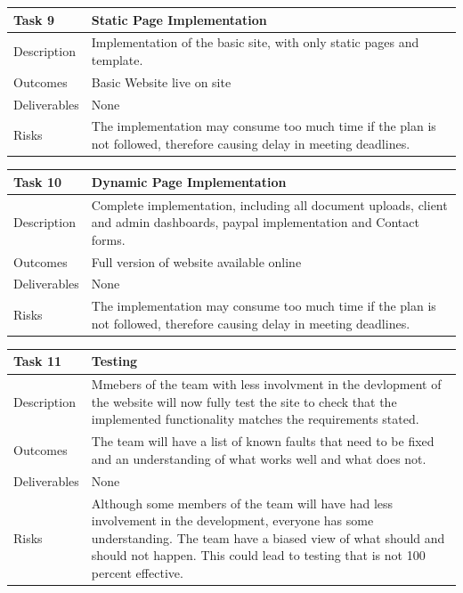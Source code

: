 \documentclass{l3proj}
\begin{document}
\begin{center}
    \begin{tabular}{ | l | p{12cm} |}
    \hline	
    Task 9 & Static Page Implementation \\ \hline
    Description & Implementation of the basic site, with only static pages and template. \\ \hline   
    Outcomes & Basic Website live on site \\ \hline
    Deliverables & None \\ \hline
    Risks & The implementation may consume too much time if the plan is not followed, therefore causing delay in meeting deadlines. \\ 
    \hline
    \end{tabular}
\end{center}

\begin{center}
    \begin{tabular}{ | l | p{12cm} |}
    \hline	
    Task 10 & Dynamic Page Implementation \\ \hline
    Description & Complete implementation, including all document uploads, client and admin dashboards, paypal implementation and Contact forms. \\ \hline   
    Outcomes & Full version of website available online \\ \hline
    Deliverables & None \\ \hline
    Risks & The implementation may consume too much time if the plan is not followed, therefore causing delay in meeting deadlines. \\ 
    \hline
    \end{tabular}
\end{center}

\begin{center}
    \begin{tabular}{ | l | p{12cm} |}
    \hline	
    Task 11 & Testing \\ \hline
    Description & Mmebers of the team with less involvment in the devlopment of the website will now fully test the site to check that the implemented functionality matches the requirements stated. \\ \hline   
    Outcomes & The team will have a list of known faults that need to be fixed and an understanding of what works well and what does not. \\ \hline
    Deliverables & None \\ \hline
    Risks & Although some members of the team will have had less involvement in the development, everyone has some understanding. The team have a biased view of what should and should not happen. This could lead to testing that is not 100 percent effective. \\ 
    \hline
    \end{tabular}
\end{center}
\end{document}
